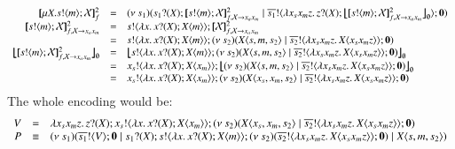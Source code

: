 \[
	\begin{array}{rcl}
		\pmapp{\recp{X}{\bout{s}{m} \rvar{X}}}{2}{f} & = &
		\newsp{s_1}{ \binp{s_1}{X} \pmapp{\bout{s}{m} \rvar{X}}{2}{f, \rvar{X} \rightarrow x_ax_m} \Par \bout{\dual{s_1}}{ \abs{x_s x_m z} \binp{z}{X} \auxmap{\pmapp{\bout{s}{m} \rvar{X}}{2}{f, \rvar{X} \rightarrow x_ax_m}}{\es} } \inact}
		\\

		\pmapp{\bout{s}{m} \rvar{X}}{2}{f, \rvar{X} \rightarrow x_ax_m} &=&
		\bout{s}{\abs{x}{\binp{x}{X} \appl{X}{m}}} \pmapp{\rvar{X}}{2}{f, \rvar{X} \rightarrow x_ax_m}
		\\
		&=& \bout{s}{\abs{x}{\binp{x}{X} \appl{X}{m}}} \newsp{s_2}{\appl{X}{s,m, s_2}  \Par \bout{\dual{s_2}}{\abs{x_s x_m z}{\appl{X}{x_s x_m z}}} \inact}
		\\

		\auxmap{\pmapp{\bout{s}{m} \rvar{X}}{2}{f, \rvar{X} \rightarrow x_ax_m}}{\es} &=&
		\auxmap{\bout{s}{\abs{x}{\binp{x}{X} \appl{X}{m}}} \newsp{s_2}{\appl{X}{s,m, s_2}  \Par \bout{\dual{s_2}}{\abs{x_s x_m z}{\appl{X}{x_s x_m z}}} \inact}}{\es}
		\\

		& = & \bout{x_s}{\abs{x}{\binp{x}{X} \appl{X}{x_m}}} \auxmap{\newsp{s_2}{\appl{X}{s,m, s_2}  \Par \bout{\dual{s_2}}{\abs{x_s x_m z}{\appl{X}{x_s x_m z}}} \inact}}{\es}
		\\
		& = & \bout{x_s}{\abs{x}{\binp{x}{X} \appl{X}{x_m}}} \newsp{s_2}{\appl{X}{x_s,x_m, s_2}  \Par \bout{\dual{s_2}}{\abs{x_s x_m z}{\appl{X}{x_s x_m z}}} \inact}
	\end{array}
\]
\noi The whole encoding would be:
\[
	\begin{array}{rcl}
		V & = & \lambda x_s x_m z.\,z ? (X) ; x_s ! \langle \lambda x.\,x ? (X) ; X\langle x_m \rangle \rangle ; (\nu\ s_2)(X\langle x_s,x_m, s_2 \rangle  \;|\; \overline{s_2} ! \langle \lambda x_s x_m z.\,X\langle x_s x_m z \rangle \rangle ; \mathbf{0})\\
		P & \equiv &
		(\nu\ s_1)(\overline{s_1} ! \langle V \rangle ; \mathbf{0} \;|\; s_1 ? (X) ; s ! \langle \lambda x.\,x ? (X) ; X\langle m \rangle \rangle ; (\nu\ s_2)(\overline{s_2} ! \langle \lambda x_s x_m z.\,X\langle x_s x_m z \rangle \rangle ; \mathbf{0}) \;|\; X\langle s,m, s_2 \rangle)
	\end{array}
\]

